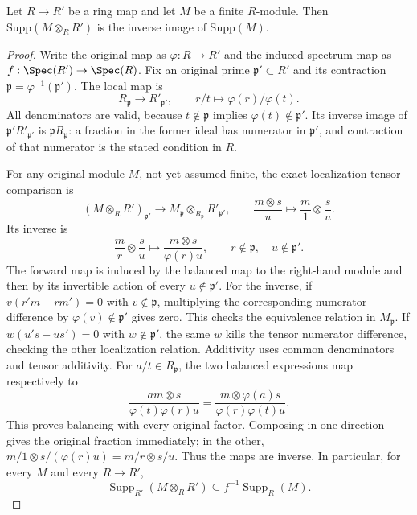 \begin{lemma}
\label{lemma-support-base-change}
Let $R \to R'$ be a ring map and let $M$ be a finite $R$-module.
Then $\text{Supp}(M \otimes_R R')$ is the inverse image of
$\text{Supp}(M)$.
\end{lemma}

\begin{proof}
Write the original map as $\varphi:R\to R'$ and the induced
spectrum map as $f:\Spec(R')\to\Spec(R)$.
Fix an original prime $\mathfrak p'\subset R'$ and its
contraction $\mathfrak p=\varphi^{-1}(\mathfrak p')$.
The local map is
$$
R_{\mathfrak p}\longrightarrow R'_{\mathfrak p'},
\qquad r/t\longmapsto\varphi(r)/\varphi(t).
$$
All denominators are valid, because $t\notin\mathfrak p$
implies $\varphi(t)\notin\mathfrak p'$. Its inverse image
of $\mathfrak p'R'_{\mathfrak p'}$ is
$\mathfrak pR_{\mathfrak p}$: a fraction in the former
ideal has numerator in $\mathfrak p'$, and contraction
of that numerator is the stated condition in $R$.

For any original module $M$, not yet assumed finite, the
exact localization-tensor comparison is
$$
(M\otimes_RR')_{\mathfrak p'}
\longrightarrow M_{\mathfrak p}\otimes_{R_{\mathfrak p}}R'_{\mathfrak p'},
\qquad \frac{m\otimes s}{u}\longmapsto\frac m1\otimes\frac su.
$$
Its inverse is
$$
\frac mr\otimes\frac su
\longmapsto\frac{m\otimes s}{\varphi(r)u},
\qquad r\notin\mathfrak p,\quad u\notin\mathfrak p'.
$$
The forward map is induced by the balanced map to the
right-hand module and then by its invertible action of
every $u\notin\mathfrak p'$. For the inverse, if
$v(r'm-rm')=0$ with $v\notin\mathfrak p$, multiplying
the corresponding numerator difference by
$\varphi(v)\notin\mathfrak p'$ gives zero. This checks
the equivalence relation in $M_{\mathfrak p}$. If
$w(u's-us')=0$ with $w\notin\mathfrak p'$, the same
$w$ kills the tensor numerator difference, checking the
other localization relation. Additivity uses common
denominators and tensor additivity. For $a/t\in R_{\mathfrak p}$,
the two balanced expressions map respectively to
$$
\frac{am\otimes s}{\varphi(t)\varphi(r)u}
=\frac{m\otimes\varphi(a)s}{\varphi(r)\varphi(t)u}.
$$
This proves balancing with every original factor. Composing
in one direction gives the original fraction immediately;
in the other, $m/1\otimes s/(\varphi(r)u)=m/r\otimes s/u$.
Thus the maps are inverse. In particular, for every $M$
and every $R\to R'$,
$$
\operatorname{Supp}_{R'}(M\otimes_RR')
\subseteq f^{-1}\operatorname{Supp}_R(M).
$$


\end{proof}
